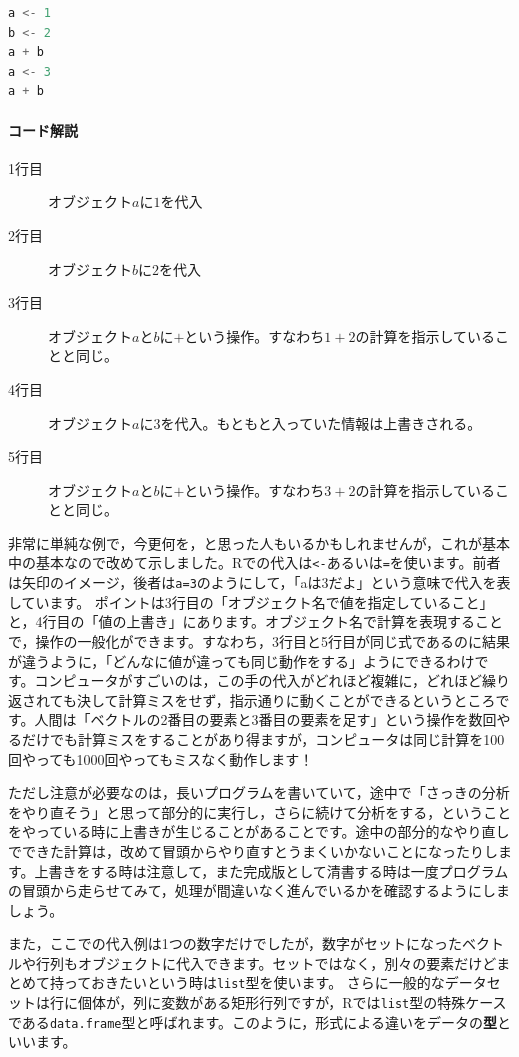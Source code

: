 \documentclass{ltjsbook}
\begin{document}
\begin{lstlisting}[language=c++,label={code:02_01},caption={代入操作}]
a <- 1
b <- 2
a + b
a <- 3
a + b
\end{lstlisting}

\paragraph{コード解説}
\begin{description}
	\item[1行目] オブジェクト$a$に$1$を代入
	\item[2行目] オブジェクト$b$に$2$を代入
	\item[3行目] オブジェクト$a$と$b$に$+$という操作。すなわち$1+2$の計算を指示していることと同じ。
	\item[4行目] オブジェクト$a$に$3$を代入。もともと入っていた情報は上書きされる。
	\item[5行目] オブジェクト$a$と$b$に$+$という操作。すなわち$3+2$の計算を指示していることと同じ。
\end{description}

非常に単純な例で，今更何を，と思った人もいるかもしれませんが，これが基本中の基本なので改めて示しました。Rでの代入は\verb|<-|あるいは\verb|=|を使います。前者は矢印のイメージ，後者は\verb|a=3|のようにして，「aは3だよ」という意味で代入を表しています。
ポイントは3行目の「オブジェクト名で値を指定していること」と，4行目の「値の上書き」にあります。オブジェクト名で計算を表現することで，操作の一般化ができます。すなわち，3行目と5行目が同じ式であるのに結果が違うように，「どんなに値が違っても同じ動作をする」ようにできるわけです。コンピュータがすごいのは，この手の代入がどれほど複雑に，どれほど繰り返されても決して計算ミスをせず，指示通りに動くことができるというところです。人間は「ベクトルの2番目の要素と3番目の要素を足す」という操作を数回やるだけでも計算ミスをすることがあり得ますが，コンピュータは同じ計算を100回やっても1000回やってもミスなく動作します！

ただし注意が必要なのは，長いプログラムを書いていて，途中で「さっきの分析をやり直そう」と思って部分的に実行し，さらに続けて分析をする，ということをやっている時に上書きが生じることがあることです。途中の部分的なやり直しでできた計算は，改めて冒頭からやり直すとうまくいかないことになったりします。上書きをする時は注意して，また完成版として清書する時は一度プログラムの冒頭から走らせてみて，処理が間違いなく進んでいるかを確認するようにしましょう。

また，ここでの代入例は1つの数字だけでしたが，数字がセットになったベクトルや行列もオブジェクトに代入できます。セットではなく，別々の要素だけどまとめて持っておきたいという時は\verb|list|型を使います。
さらに一般的なデータセットは行に個体が，列に変数がある矩形行列ですが，Rでは\verb|list|型の特殊ケースである\verb|data.frame|型と呼ばれます。このように，形式による違いをデータの\textbf{型}といいます。
\end{document}
